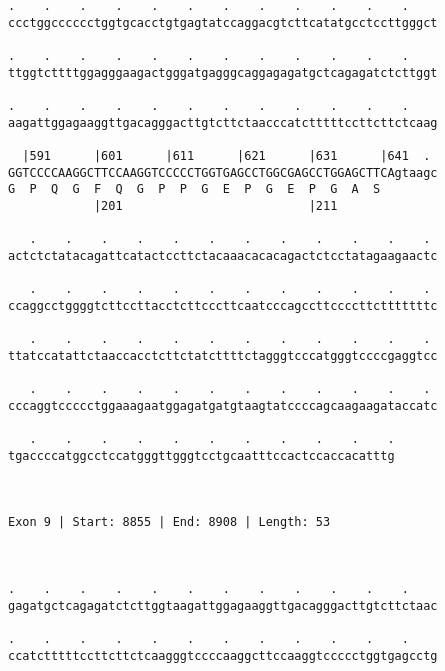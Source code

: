 \documentclass{article}
\begin{document}
\begin{Verbatim}
.    .    .    .    .    .    .    .    .    .    .    .    
ccctggcccccctggtgcacctgtgagtatccaggacgtcttcatatgcctccttgggct
                                                            
.    .    .    .    .    .    .    .    .    .    .    .    
ttggtcttttggagggaagactgggatgagggcaggagagatgctcagagatctcttggt
                                                            
.    .    .    .    .    .    .    .    .    .    .    .    
aagattggagaaggttgacagggacttgtcttctaacccatctttttccttcttctcaag
                                                            
  |591      |601      |611      |621      |631      |641  . 
GGTCCCCAAGGCTTCCAAGGTCCCCCTGGTGAGCCTGGCGAGCCTGGAGCTTCAgtaagc
G  P  Q  G  F  Q  G  P  P  G  E  P  G  E  P  G  A  S        
            |201                          |211              
  
   .    .    .    .    .    .    .    .    .    .    .    . 
actctctatacagattcatactccttctacaaacacacagactctcctatagaagaactc
                                                            
   .    .    .    .    .    .    .    .    .    .    .    . 
ccaggcctggggtcttccttacctcttcccttcaatcccagccttccccttctttttttc
                                                            
   .    .    .    .    .    .    .    .    .    .    .    . 
ttatccatattctaaccacctcttctatcttttctagggtcccatgggtccccgaggtcc
                                                            
   .    .    .    .    .    .    .    .    .    .    .    . 
cccaggtccccctggaaagaatggagatgatgtaagtatccccagcaagaagataccatc
                                                            
   .    .    .    .    .    .    .    .    .    .    .
tgaccccatggcctccatgggttgggtcctgcaatttccactccaccacatttg
                                                      
                                                      
 
Exon 9 | Start: 8855 | End: 8908 | Length: 53



.    .    .    .    .    .    .    .    .    .    .    .    
gagatgctcagagatctcttggtaagattggagaaggttgacagggacttgtcttctaac
                                                            
.    .    .    .    .    .    .    .    .    .    .    .    
ccatctttttccttcttctcaagggtccccaaggcttccaaggtccccctggtgagcctg
                                                            

\end{Verbatim}
\end{document}
